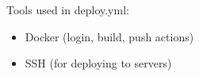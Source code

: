 
\noindent  Tools used in deploy.yml:
\begin{itemize}
    \item Docker (login, build, push actions)
    \item SSH (for deploying to servers)
\end{itemize}





